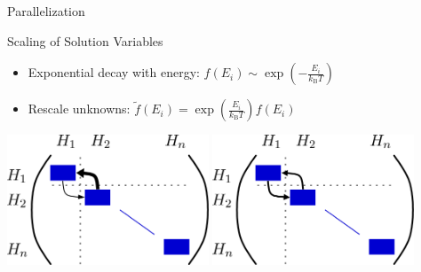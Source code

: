 \documentclass[usepdftitle=false,10pt]{beamer}
\renewcommand{\matrix}[1]{\boldsymbol{#1}}
\renewcommand{\vector}[1]{\boldsymbol{#1}}
\begin{document}
\begin{frame}{Parallelization}
 \begin{block}{Scaling of Solution Variables}
  \begin{itemize}
   \item Exponential decay with energy: $f(E_i) \sim \exp(- \frac{E_i}{k_\mathrm{B} T})$
   \item Rescale unknowns: $\tilde{f}(E_i) = \exp( \frac{E_i}{k_\mathrm{B} T}) f(E_i)$
  \end{itemize}
  \begin{center}
   \includegraphics[width=0.45\textwidth]{matrix-structure-1} \hfill
   \includegraphics[width=0.45\textwidth]{matrix-structure-2}
  \end{center}
 \end{block}

\end{frame}
\end{document}
